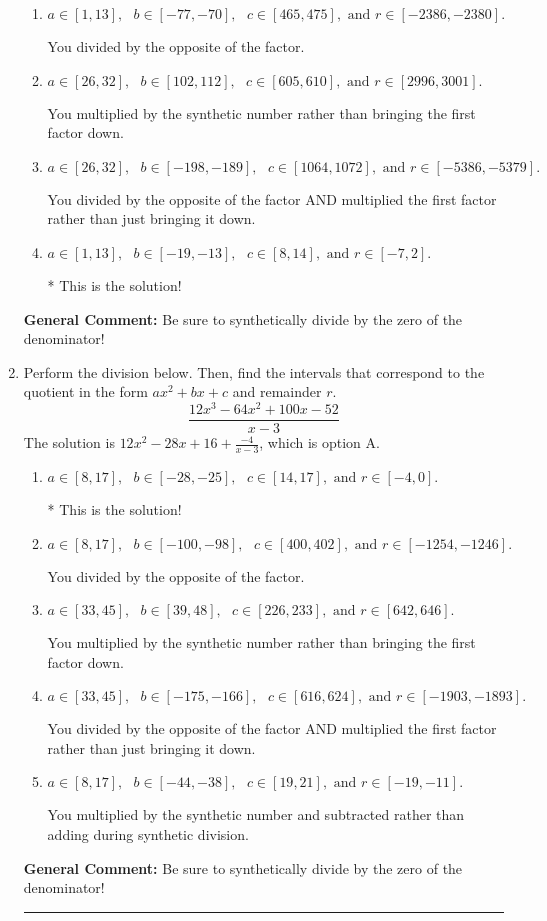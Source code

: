 \documentclass{extbook}[14pt]
\newcommand{\litem}[1]{\item #1

\rule{\textwidth}{0.4pt}}
\begin{document}
\begin{enumerate}
{\begin{enumerate}[label=\Alph*.]
 You multiplied by the synthetic number and subtracted rather than adding during synthetic division.
\item \( a \in [1, 13], \text{   } b \in [-77, -70], \text{   } c \in [465, 475], \text{   and   } r \in [-2386, -2380]. \)

 You divided by the opposite of the factor.
\item \( a \in [26, 32], \text{   } b \in [102, 112], \text{   } c \in [605, 610], \text{   and   } r \in [2996, 3001]. \)

 You multiplied by the synthetic number rather than bringing the first factor down.
\item \( a \in [26, 32], \text{   } b \in [-198, -189], \text{   } c \in [1064, 1072], \text{   and   } r \in [-5386, -5379]. \)

 You divided by the opposite of the factor AND multiplied the first factor rather than just bringing it down.
\item \( a \in [1, 13], \text{   } b \in [-19, -13], \text{   } c \in [8, 14], \text{   and   } r \in [-7, 2]. \)

* This is the solution!
\end{enumerate}

\textbf{General Comment:} Be sure to synthetically divide by the zero of the denominator!
}
\litem{
Perform the division below. Then, find the intervals that correspond to the quotient in the form $ax^2+bx+c$ and remainder $r$.
\[ \frac{12x^{3} -64 x^{2} +100 x -52}{x -3} \]The solution is \( 12x^{2} -28 x + 16 + \frac{-4}{x -3} \), which is option A.\begin{enumerate}[label=\Alph*.]
\item \( a \in [8, 17], \text{   } b \in [-28, -25], \text{   } c \in [14, 17], \text{   and   } r \in [-4, 0]. \)

* This is the solution!
\item \( a \in [8, 17], \text{   } b \in [-100, -98], \text{   } c \in [400, 402], \text{   and   } r \in [-1254, -1246]. \)

 You divided by the opposite of the factor.
\item \( a \in [33, 45], \text{   } b \in [39, 48], \text{   } c \in [226, 233], \text{   and   } r \in [642, 646]. \)

 You multiplied by the synthetic number rather than bringing the first factor down.
\item \( a \in [33, 45], \text{   } b \in [-175, -166], \text{   } c \in [616, 624], \text{   and   } r \in [-1903, -1893]. \)

 You divided by the opposite of the factor AND multiplied the first factor rather than just bringing it down.
\item \( a \in [8, 17], \text{   } b \in [-44, -38], \text{   } c \in [19, 21], \text{   and   } r \in [-19, -11]. \)

 You multiplied by the synthetic number and subtracted rather than adding during synthetic division.
\end{enumerate}

\textbf{General Comment:} Be sure to synthetically divide by the zero of the denominator!
}
\end{enumerate}
\end{document}
